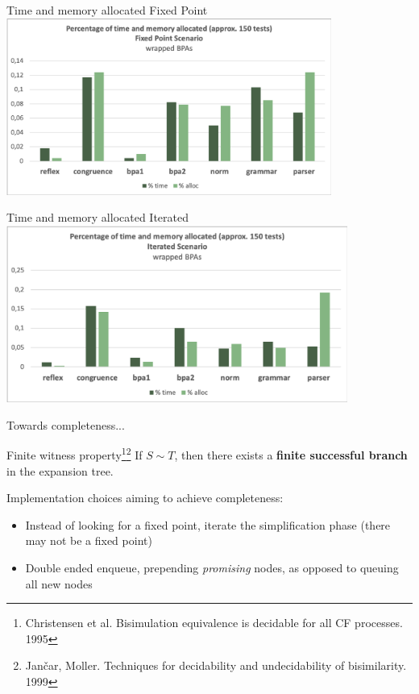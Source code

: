 \documentclass[10pt]{beamer}
\begin{document}
\begin{frame}{Time and memory allocated \hfill {\color{mLightBrown}Fixed Point}}
	\hspace*{-4mm}\includegraphics[height=5.8cm]{img/fixed_point2}
\end{frame}

\begin{frame}{Time and memory allocated \hfill {\color{mLightBrown}Iterated }}
	\hspace*{-4mm}\includegraphics[height=5.8cm]{img/iterated2} 
\end{frame}


\begin{frame}{Towards completeness...}

	\begin{block}{Finite witness property\footnote{ Christensen et al. Bisimulation equivalence is decidable for all CF processes. 1995}\footnote{Jan{\v{c}}ar, Moller. Techniques for decidability and undecidability of bisimilarity. 1999}}
		\smallskip
		If $S\sim T$, then there exists a {\bf finite successful branch} in the expansion tree.
	\end{block}

	\vspace*{5mm}
	
	Implementation choices aiming to achieve completeness:
	\begin{itemize}
		\item Instead of looking for a fixed point, iterate the simplification phase (there may not be a fixed point)
		\item Double ended enqueue, prepending \emph{promising} nodes, as opposed to queuing all new nodes
	\end{itemize}
\end{frame}
\end{document}
